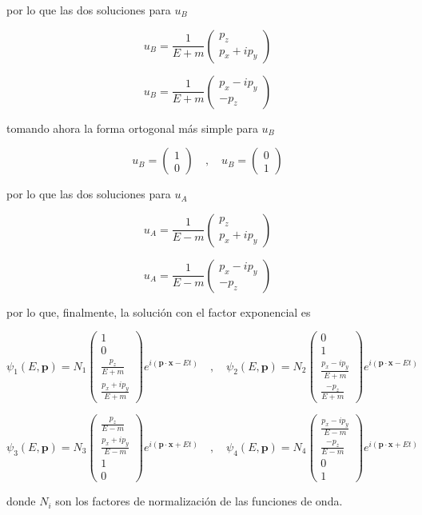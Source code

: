 por lo que las dos soluciones para $u_B$ 

$$ u_B = \frac{1}{E+m}\begin{pmatrix}
p_z \\
p_x + ip_y
\end{pmatrix} $$

$$ u_B = \frac{1}{E+m}\begin{pmatrix}
p_x - ip_y \\
-p_z
\end{pmatrix} $$

tomando ahora la forma ortogonal más simple para $u_B$

$$ u_B = \begin{pmatrix}
1 \\
0
\end{pmatrix} \quad , \quad u_B = \begin{pmatrix}
0 \\
1
\end{pmatrix} $$

por lo que las dos soluciones para $u_A$ 

$$ u_A = \frac{1}{E-m}\begin{pmatrix}
p_z \\
p_x + ip_y
\end{pmatrix} $$

$$ u_A = \frac{1}{E-m}\begin{pmatrix}
p_x - ip_y \\
-p_z
\end{pmatrix} $$

por lo que, finalmente, la solución con el factor exponencial es

$$ \psi_1(E,\textbf{p})=N_1\begin{pmatrix}
1 \\
0 \\
\frac{p_z}{E+m} \\
\frac{p_x +ip_y}{E+m} 
\end{pmatrix}e^{i(\textbf{p}\cdot \textbf{x}-Et)} \quad , \quad \psi_2(E,\textbf{p})=N_2\begin{pmatrix}
0 \\
1 \\
\frac{p_x-ip_y}{E+m} \\
\frac{-p_z}{E+m}
\end{pmatrix}e^{i(\textbf{p}\cdot \textbf{x}-Et)} $$

$$ \psi_3(E,\textbf{p})=N_3\begin{pmatrix}
\frac{p_z}{E-m} \\
\frac{p_x + ip_y}{E-m} \\
1 \\
0 
\end{pmatrix}e^{i(\textbf{p}\cdot \textbf{x}+Et)} \quad , \quad \psi_4(E,\textbf{p})=N_4\begin{pmatrix}
\frac{p_x-ip_y}{E-m} \\
\frac{-p_z}{E-m} \\
0 \\
1 
\end{pmatrix}e^{i(\textbf{p}\cdot \textbf{x}+Et)}  $$

donde $N_i$ son los factores de normalización de las funciones de onda.